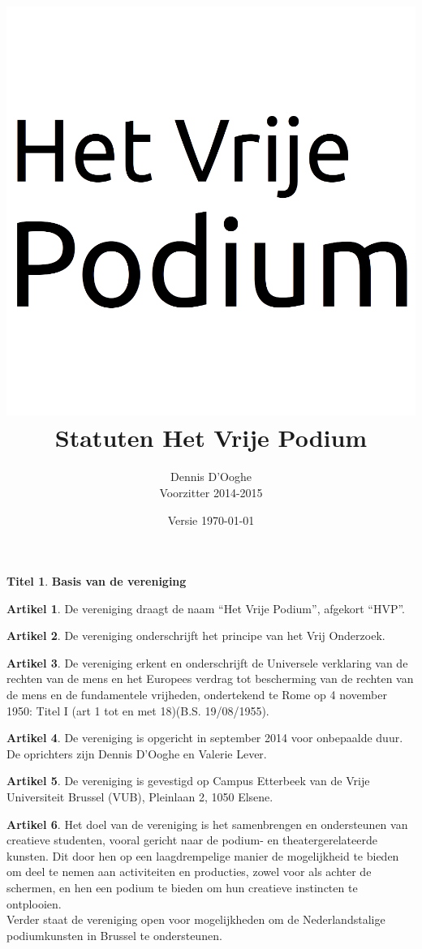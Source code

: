 \documentclass[a4paper,10pt]{article}
\title{\vspace{-2.0cm}\includegraphics[scale=0.3]{img/logo.png}\\
  \vspace{1cm}Statuten Het Vrije Podium}
\author{Dennis D'Ooghe\\Voorzitter 2014-2015}
\date{Versie \today} %
\theoremstyle{definition}
\newtheorem{titel}{\newline\Large Titel}
\newtheorem{artikelbase}{\large Artikel}
\newenvironment{artikel}
  {\begin{artikelbase}}
  {\smallskip
   \end{artikelbase}}
\newcommand{\ttext}[1]{\Large \textbf{#1} \normalsize}
\newcommand{\ttextcr}{\hfill\newline}
\begin{document}
\maketitle

\begin{versionhistory}
\end{versionhistory}

\newpage


\begin{titel}\ttext{Basis van de vereniging}

  \begin{artikel}\ttextcr
    De vereniging draagt de naam ``Het Vrije Podium'', afgekort ``HVP''.
  \end{artikel}

  \begin{artikel}\ttextcr
    De vereniging onderschrijft het principe van het Vrij Onderzoek.
  \end{artikel}

  \begin{artikel}\ttextcr
    De vereniging erkent en onderschrijft de Universele verklaring van de rechten van de mens en het Europees verdrag tot bescherming van de rechten van de mens en de fundamentele vrijheden, ondertekend te Rome op 4 november 1950: Titel I (art 1 tot en met 18)(B.S. 19/08/1955).
  \end{artikel}

  \begin{artikel}\label{kring-oprichting}\ttextcr
    De vereniging is opgericht in september 2014 voor onbepaalde duur.
    De oprichters zijn Dennis D'Ooghe en Valerie Lever.
  \end{artikel}

  \begin{artikel}\ttextcr
    De vereniging is gevestigd op Campus Etterbeek van de Vrije Universiteit Brussel (VUB), Pleinlaan 2, 1050 Elsene.
  \end{artikel}

  \begin{artikel}\ttextcr
    Het doel van de vereniging is het samenbrengen en ondersteunen van creatieve studenten, vooral gericht naar de podium- en theatergerelateerde kunsten.
    Dit door hen op een laagdrempelige manier de mogelijkheid te bieden om deel te nemen aan activiteiten en producties, zowel voor als achter de schermen, en hen een podium te bieden om hun creatieve instincten te ontplooien.\\
    Verder staat de vereniging open voor mogelijkheden om de Nederlandstalige podiumkunsten in Brussel te ondersteunen.
  \end{artikel}


\end{titel}
\end{document}
